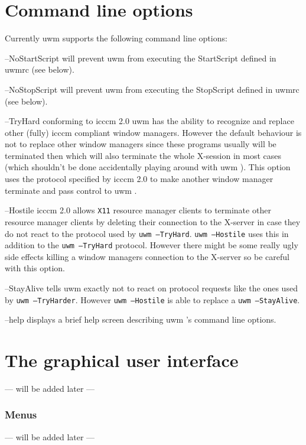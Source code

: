 \documentclass[10pt,a4paper]{article}
\newcommand{\uwm}{{\sc uwm} }
\newenvironment{ttdesc}[1]{
   \begin{list}{}{
          \renewcommand{\makelabel}[1]{\texttt{##1\hfill}}}}{\end{list}}
\begin{document}
\part{Command line options}
Currently uwm supports the following command line options:
\begin{ttdesc}{description}
\item[--NoStartScript] will prevent \uwm from executing the StartScript defined in uwmrc (see below).
\item[--NoStopScript] will prevent \uwm from executing the StopScript defined in uwmrc (see below).
\item[--TryHard] conforming to \textsf{icccm 2.0} \uwm has the ability to recognize and replace other (fully) icccm compliant window managers. However the default behaviour is not to replace other window managers since these programs usually will be terminated then which will also terminate the whole X-session in most cases (which shouldn't be done accidentally playing around with \uwm). This option uses the protocol specified by \textsf{icccm 2.0} to make another window manager terminate and pass control to \uwm.
\item[--Hostile] \textsf{icccm 2.0} allows \texttt{X11} resource manager clients to terminate other resource manager clients by deleting their connection to the X-server in case they do not react to the protocol used by \texttt{uwm --TryHard}. \texttt{uwm --Hostile} uses this in addition to the \texttt{uwm --TryHard} protocol. However there might be some really ugly side effects killing a window managers connection to the X-server so be careful with this option.
\item[--StayAlive] tells \uwm exactly not to react on protocol requests like the ones used by \texttt{uwm --TryHarder}. However \texttt{uwm --Hostile} is able to replace a \texttt{uwm --StayAlive}.
\item[--help] displays a brief help screen describing \uwm's command line options.
\end{ttdesc}

\part{The graphical user interface}
\begin{center} --- will be added later --- \end{center}
\section{Menus}
\begin{center} --- will be added later --- \end{center}
\end{document}
